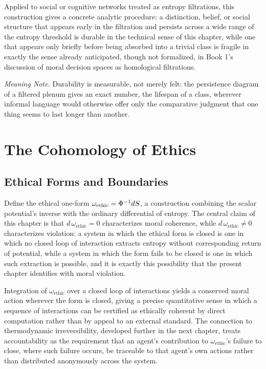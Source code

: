 Applied to social or cognitive networks treated as entropy filtrations, this construction gives a concrete analytic procedure: a distinction, belief, or social structure that appears early in the filtration and persists across a wide range of the entropy threshold is durable in the technical sense of this chapter, while one that appears only briefly before being absorbed into a trivial class is fragile in exactly the sense already anticipated, though not formalized, in Book 1's discussion of moral decision spaces as homological filtrations.

\emph{Meaning Note.} Durability is measurable, not merely felt: the persistence diagram of a filtered plenum gives an exact number, the lifespan of a class, wherever informal language would otherwise offer only the comparative judgment that one thing seems to last longer than another.

\part{The Cohomology of Ethics}

\chapter{Ethical Forms and Boundaries}

Define the ethical one-form $\omega_{\mathrm{ethic}} = \Phi^{-1} dS$, a construction combining the scalar potential's inverse with the ordinary differential of entropy. The central claim of this chapter is that $d\,\omega_{\mathrm{ethic}} = 0$ characterizes moral coherence, while $d\,\omega_{\mathrm{ethic}} \neq 0$ characterizes violation: a system in which the ethical form is closed is one in which no closed loop of interaction extracts entropy without corresponding return of potential, while a system in which the form fails to be closed is one in which such extraction is possible, and it is exactly this possibility that the present chapter identifies with moral violation.

Integration of $\omega_{\mathrm{ethic}}$ over a closed loop of interactions yields a conserved moral action wherever the form is closed, giving a precise quantitative sense in which a sequence of interactions can be certified as ethically coherent by direct computation rather than by appeal to an external standard. The connection to thermodynamic irreversibility, developed further in the next chapter, treats accountability as the requirement that an agent's contribution to $\omega_{\mathrm{ethic}}$'s failure to close, where such failure occurs, be traceable to that agent's own actions rather than distributed anonymously across the system.

